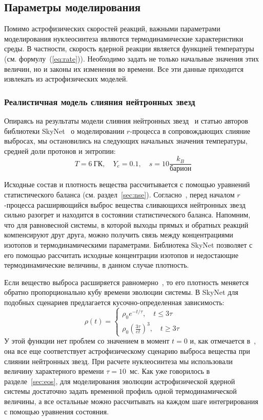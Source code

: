\subsection{Параметры моделирования}
Помимо астрофизических скоростей реакций, важными параметрами моделирования нуклеосинтеза являются термодинамические характеристики среды. В частности, скорость ядерной реакции является функцией температуры (см. формулу~(\ref{eq:rate})). Необходимо задать не только начальные значения этих величин, но и законы их изменения во времени. Все эти данные приходится извлекать из астрофизических моделей.

\subsubsection{Реалистичная модель слияния нейтронных звезд}
Опираясь на результаты модели слияния нейтронных звезд~\cite{korobkin2012} и статью авторов библиотеки SkyNet~\cite{lippuner2015} о моделировании $r$-процесса в сопровождающих слияние выбросах, мы остановились на следующих начальных значения температуры, средней доли протонов и энтропии:
\begin{equation}
\displaystyle
T = 6~\text{ГК},\quad Y_e = 0.1,\quad s = 10 \frac{k_B}{\text{барион}}
\end{equation}

Исходные состав и плотность вещества рассчитывается с помощью уравнений статистического баланса (см. раздел~\ref{sec:nse}). Согласно~\cite{goriely2011,korobkin2012,theilemann2017}, перед началом $r$-процесса расширяющийся выброс вещества сливающихся нейтронных звезд сильно разогрет и находится в состоянии статистического баланса. Напомним, что для равновесной системы, в которой выходы прямых и обратных реакций компенсируют друг друга, можно получить связь между концентрациями изотопов и термодинамическими параметрами. Библиотека SkyNet позволяет с его помощью рассчитать исходные концентрации изотопов и недостающие термодинамические величины, в данном случае плотность.

Если вещество выброса расширяется равномерно~\cite{korobkin2012,lippuner2015}, то его плотность меняется обратно пропорционально кубу времени эволюции системы. В SkyNet для подобных сценариев предлагается кусочно-определенная зависимость:
\begin{equation}
\displaystyle
\rho(t) = \begin{cases}
\rho_0 e^{-t/\tau}, \quad t \leq 3\tau\\
\rho_0 \left( \frac{3\tau}{et} \right)^3, \quad t \geq 3\tau
\end{cases}
\end{equation}
У этой функции нет проблем со значением в момент $t=0$ и, как отмечается в~\cite{lippuner2015}, она все еще соответствует астрофизическому сценарию выброса вещества при слиянии нейтронных звезд. При расчете нуклеосинтеза мы использовали величину характерного времени $\tau = 10$~мс. Как уже говорилось в разделе~\ref{sec:eos}, для моделирования эволюции астрофизической ядерной системы достаточно задать временной профиль одной термодинамической величины, а все остальные можно рассчитывать на каждом шаге интегрирования с помощью уравнения состояния.

